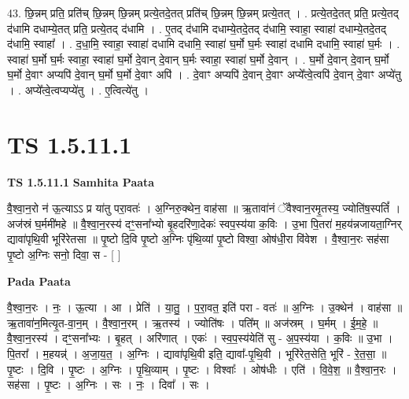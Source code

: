 \documentclass[17pt]{extarticle}
\begin{document}
43. छि॒न्नम् प्रति॒ प्रति॑च् छि॒न्नम् छि॒न्नम् प्रत्ये॒तदे॒तत् प्रति॑च् छि॒न्नम् छि॒न्नम् प्रत्ये॒तत् । . प्रत्ये॒तदे॒तत् प्रति॒ प्रत्ये॒तद् द॑धामि दधाम्ये॒तत् प्रति॒ प्रत्ये॒तद् द॑धामि । . ए॒तद् द॑धामि दधाम्ये॒तदे॒तद् द॑धामि॒ स्वाहा॒ स्वाहा॑ दधाम्ये॒तदे॒तद् द॑धामि॒ स्वाहा᳚ । . द॒धा॒मि॒ स्वाहा॒ स्वाहा॑ दधामि दधामि॒ स्वाहा॑ घ॒र्मो घ॒र्मः स्वाहा॑ दधामि दधामि॒ स्वाहा॑ घ॒र्मः । . स्वाहा॑ घ॒र्मो घ॒र्मः स्वाहा॒ स्वाहा॑ घ॒र्मो दे॒वान् दे॒वान् घ॒र्मः स्वाहा॒ स्वाहा॑ घ॒र्मो दे॒वान् । . घ॒र्मो दे॒वान् दे॒वान् घ॒र्मो घ॒र्मो दे॒वाꣳ अप्यपि॑ दे॒वान् घ॒र्मो घ॒र्मो दे॒वाꣳ अपि॑ । . दे॒वाꣳ अप्यपि॑ दे॒वान् दे॒वाꣳ अप्ये᳚त्वे॒त्वपि॑ दे॒वान् दे॒वाꣳ अप्ये॑तु । . अप्ये᳚त्वे॒त्वप्यप्ये॑तु । . ए॒त्वित्ये॑तु । \newline
\pagebreak
{}

\section{ TS 1.5.11.1 }

\textbf{TS 1.5.11.1 } \newline
\textbf{Samhita Paata} \newline

वै॒श्वा॒न॒रो न॑ ऊ॒त्याऽऽ प्र या॑तु परा॒वतः॑ । अ॒ग्निरु॒क्थेन॒ वाह॑सा ॥ ऋ॒तावा॑नं ॅवैश्वान॒रमृ॒तस्य॒ ज्योति॑ष॒स्पतिं᳚ । अज॑स्रं घ॒र्ममी॑महे ॥ वै॒श्वा॒न॒रस्य॑ दꣳ॒॒सना᳚भ्यो बृ॒हदरि॑णा॒देकः॑ स्वप॒स्य॑या क॒विः । उ॒भा पि॒तरा॑ म॒हय॑न्नजायता॒ग्निर् द्यावा॑पृथि॒वी भूरि॑रेतसा ॥ पृ॒ष्टो दि॒वि पृ॒ष्टो अ॒ग्निः पृ॑थि॒व्यां पृ॒ष्टो विश्वा॒ ओष॑धी॒रा वि॑वेश । वै॒श्वा॒न॒रः सह॑सा पृ॒ष्टो अ॒ग्निः सनो॒ दिवा॒ स - [ ] \newline

\textbf{Pada Paata} \newline

वै॒श्वा॒न॒रः । नः॒ । ऊ॒त्या । आ । प्रेति॑ । या॒तु॒ । प॒रा॒वत॒ इति॑ परा - वतः॑ ॥ अ॒ग्निः । उ॒क्थेन॑ । वाह॑सा ॥ ऋ॒तावा॑न॒मित्यृ॒त-वा॒न॒म् । वै॒श्वा॒न॒रम् । ऋ॒तस्य॑ । ज्योति॑षः । पति᳚म् ॥ अज॑स्रम् । घ॒र्मम् । ई॒म॒हे॒ ॥ वै॒श्वा॒न॒रस्य॑ । दꣳ॒॒सना᳚भ्यः । बृ॒हत् । अरि॑णात् । एकः॑ । स्व॒प॒स्य॑येति॑ सु - अ॒प॒स्य॑या । क॒विः ॥ उ॒भा । पि॒तरा᳚ । म॒हयन्न्॑ । अ॒जा॒य॒त॒ । अ॒ग्निः । द्यावा॑पृथि॒वी इति॒ द्यावा᳚-पृ॒थि॒वी । भूरि॑रेत॒सेति॒ भूरि॑ - रे॒त॒सा॒ ॥ पृ॒ष्टः । दि॒वि । पृ॒ष्टः । अ॒ग्निः । पृ॒थि॒व्याम् । पृ॒ष्टः । विश्वाः᳚ । ओष॑धीः । एति॑ । वि॒वे॒श॒ ॥ वै॒श्वा॒न॒रः । सह॑सा । पृ॒ष्टः । अ॒ग्निः । सः । नः॒ । दिवा᳚ । सः ।  \newline
\end{document}
